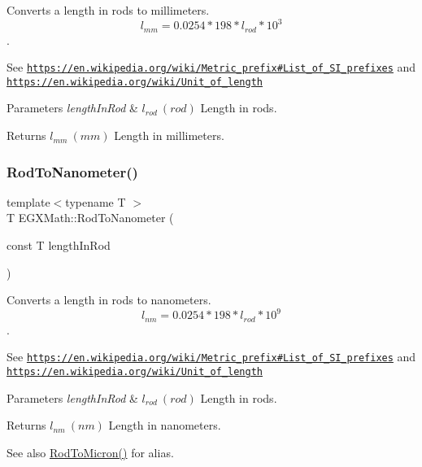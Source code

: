 Converts a length in rods to millimeters. \[ l_{mm}=0.0254 * 198 * l_{rod} * 10^{3} \]. 

See \href{https://en.wikipedia.org/wiki/Metric_prefix#List_of_SI_prefixes}{\tt https\+://en.\+wikipedia.\+org/wiki/\+Metric\+\_\+prefix\#\+List\+\_\+of\+\_\+\+S\+I\+\_\+prefixes} and \href{https://en.wikipedia.org/wiki/Unit_of_length}{\tt https\+://en.\+wikipedia.\+org/wiki/\+Unit\+\_\+of\+\_\+length} 
\begin{DoxyParams}{Parameters}
{\em length\+In\+Rod} & $ l_{rod}\ (rod)$ Length in rods. \\
\hline
\end{DoxyParams}
\begin{DoxyReturn}{Returns}
$ l_{mm}\ (mm)$ Length in millimeters. 
\end{DoxyReturn}
\mbox{\label{group___e_g_x_math-_conversions-_length_conversions-_surveyors-_rod-_s_i_gaa41557dd8cc5aa5ff83312665e8a4331}} 
\subsubsection{\texorpdfstring{Rod\+To\+Nanometer()}{RodToNanometer()}}
{\footnotesize\ttfamily template$<$typename T $>$ \\
T E\+G\+X\+Math\+::\+Rod\+To\+Nanometer (\begin{DoxyParamCaption}\item[{const T}]{length\+In\+Rod }\end{DoxyParamCaption})}



Converts a length in rods to nanometers. \[ l_{nm}=0.0254 * 198 * l_{rod} * 10^{9} \]. 

See \href{https://en.wikipedia.org/wiki/Metric_prefix#List_of_SI_prefixes}{\tt https\+://en.\+wikipedia.\+org/wiki/\+Metric\+\_\+prefix\#\+List\+\_\+of\+\_\+\+S\+I\+\_\+prefixes} and \href{https://en.wikipedia.org/wiki/Unit_of_length}{\tt https\+://en.\+wikipedia.\+org/wiki/\+Unit\+\_\+of\+\_\+length} 
\begin{DoxyParams}{Parameters}
{\em length\+In\+Rod} & $ l_{rod}\ (rod)$ Length in rods. \\
\hline
\end{DoxyParams}
\begin{DoxyReturn}{Returns}
$ l_{nm}\ (nm)$ Length in nanometers. 
\end{DoxyReturn}
\begin{DoxySeeAlso}{See also}
\mbox{\hyperlink{group___e_g_x_math-_conversions-_length_conversions-_surveyors-_rod-_non-_s_i_ga91daf7bb89d486f6c8523a5436e5599d}{Rod\+To\+Micron()}} for alias. 
\end{DoxySeeAlso}
\mbox{\label{group___e_g_x_math-_conversions-_length_conversions-_surveyors-_rod-_s_i_ga058c851a5a43a832b21eb2b077683b17}} 
